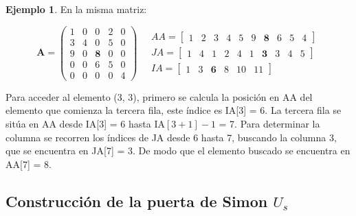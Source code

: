 \documentclass{article}
\newcommand*\mat[1]{ \begin{pmatrix} #1 \end{pmatrix}}
\newcommand*\arr[1]{ \begin{bmatrix} #1 \end{bmatrix}}
\theoremstyle{definition}
\newtheorem{ejemplo}{Ejemplo}[section]
\begin{document}
\begin{ejemplo} En la misma matriz:

$$ \textbf{A} = \mat{
	1 & 0 & 0 & 2 & 0 \\
	3 & 4 & 0 & 5 & 0 \\
	9 & 0 & \textbf{8} & 0 & 0 \\
	0 & 0 & 6 & 5 & 0 \\
	0 & 0 & 0 & 0 & 4 }
\quad
\begin{aligned}
	AA = \arr{ 1 & 2 & 3 & 4 & 5  & 9 & \textbf{8} & 6 & 5 & 4} \\
	JA = \arr{ 1 & 4 & 1 & 2 & 4  & 1 & \textbf{3} & 3 & 4 & 5}\\
	IA = \arr{ 1 & 3 & \textbf{6} & 8 & 10 & 11}
\end{aligned}
$$

Para acceder al elemento (3, 3), primero se calcula la posición en AA del 
elemento que comienza la tercera fila, este índice es IA[3] = 6. La tercera fila 
se sitúa en AA desde IA[3] = 6 hasta IA$[3+1]-1$ = 7.  Para determinar la 
columna se recorren los índices de JA desde 6 hasta 7, buscando la columna 3, 
que se encuentra en JA[7] = 3. De modo que el elemento buscado se encuentra en 
AA[7] = 8.

\end{ejemplo}

\subsection{Construcción de la puerta de Simon $U_s$}
\end{document}
